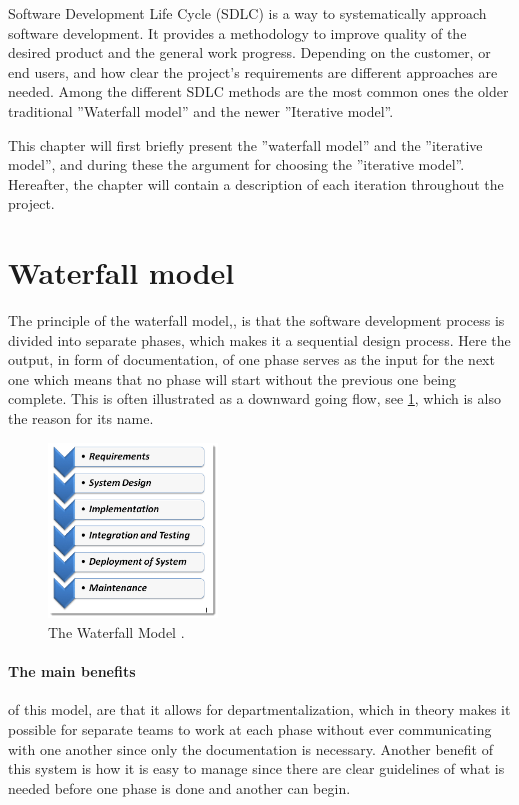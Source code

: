 Software Development Life Cycle (SDLC) is a way to systematically approach software development.
It provides a methodology to improve quality of the desired product and the general work progress.
Depending on the customer, or end users, and how clear the project's requirements are different approaches are needed.
Among the different SDLC methods are the most common ones the older traditional ''Waterfall model'' and the newer ''Iterative model''. \cite{SDLC-Toolsqa}

This chapter will first briefly present the ''waterfall model'' and the ''iterative model'', and during these the argument for choosing the ''iterative model''.
Hereafter, the chapter will contain a description of each iteration throughout the project.


\section{Waterfall model}\label{sec:WaterfallModel}
The principle of the waterfall model,\cite{Waterfall-Toolsqa}, is that the software development process is divided into separate phases, which makes it a sequential design process.
Here the output, in form of documentation, of one phase serves as the input for the next one which means that no phase will start without the previous one being complete.
This is often illustrated as a downward going flow, see \cref{fig:Waterfall}, which is also the reason for its name.

\begin{figure}[H]
	\centering
	\includegraphics[width=0.4\textwidth]{billeder/WaterFall-Model.png}
	\caption{The Waterfall Model \cite{Waterfall-Toolsqa}.}\label{fig:Waterfall}
\end{figure}

\paragraph{The main benefits} of this model, are that it allows for departmentalization, which in theory makes it possible for separate teams to work at each phase without ever communicating with one another since only the documentation is necessary.
Another benefit of this system is how it is easy to manage since there are clear guidelines of what is needed before one phase is done and another can begin.

